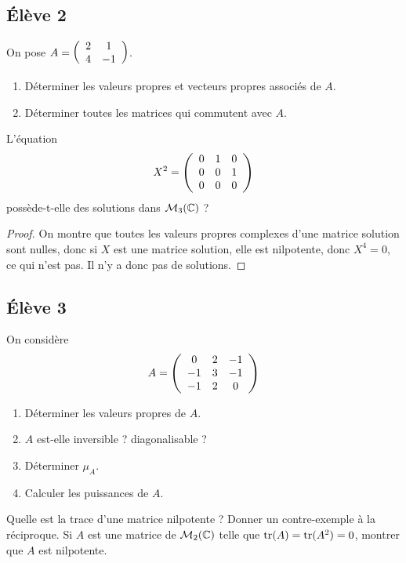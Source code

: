 \documentclass[10pt]{scrartcl}
\begin{document}
    \subsection*{Élève 2}
    \begin{ccp}
        On pose $A=\left(\begin{array}{c c} 2 & 1\\ 4 & -1\end{array}\right)$.
        \begin{enumerate}
            \item Déterminer les valeurs propres et vecteurs propres associés de $A$.
            \item Déterminer toutes les matrices qui commutent avec $A$.
        \end{enumerate}
    \end{ccp}

    \begin{exo}
        L'équation 
        \[
            X^2=\left(\begin{array}{c c c} 0 & 1 & 0\\ 0 & 0 & 1\\ 0 & 0 & 0\end{array}\right)
        \]
        possède-t-elle des solutions dans $\mathcal M_3(\operatorname{\mathbb C})$ ? 
    \end{exo}

    \begin{proof}
        On montre que toutes les valeurs propres complexes d'une matrice solution
        sont nulles, donc si $X$ est une matrice solution, elle est nilpotente, donc 
        $X^4=0$, ce qui n'est pas. 
        Il n'y a donc pas de solutions.
    \end{proof}

    \subsection*{Élève 3}
    \begin{ccp}
        On considère 
        \[
            A=\left(\begin{array}{c c c}
                0 & 2 & -1\\
                -1 & 3 & -1\\
                -1 & 2 & 0
            \end{array}\right)
        \]
        \begin{enumerate}
            \item Déterminer les valeurs propres de $A$. 
            \item $A$ est-elle inversible ? diagonalisable ?
            \item Déterminer $\mu_A$.
            \item Calculer les puissances de $A$.
        \end{enumerate}
    \end{ccp}

    \begin{exo}
        Quelle est la trace d'une matrice nilpotente ? 
        Donner un contre-exemple à la réciproque. 
        Si $A$ est une matrice de $\mathcal M_2(\operatorname{\mathbb C})$ 
        telle que $\operatorname{tr}(A)=\operatorname{tr}(A^2)=0$, montrer que $A$ 
        est nilpotente.
    \end{exo}
\end{document}
